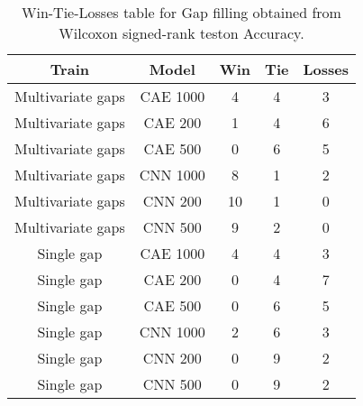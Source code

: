 \begin{table}[H]
\centering
\begin{tabular}{|c|c|c|c|c|}

    \textbf{Train} & \textbf{Model} &  \textbf{Win} &  \textbf{Tie} &  \textbf{Losses} \\
\hline

 Multivariate gaps &       CAE 1000 &             4 &             4 &                3 \\
\hline
 Multivariate gaps &        CAE 200 &             1 &             4 &                6 \\
\hline
 Multivariate gaps &        CAE 500 &             0 &             6 &                5 \\
\hline
 Multivariate gaps &       CNN 1000 &             8 &             1 &                2 \\
\hline
 Multivariate gaps &        CNN 200 &            10 &             1 &                0 \\
\hline
 Multivariate gaps &        CNN 500 &             9 &             2 &                0 \\
\hline
        Single gap &       CAE 1000 &             4 &             4 &                3 \\
\hline
        Single gap &        CAE 200 &             0 &             4 &                7 \\
\hline
        Single gap &        CAE 500 &             0 &             6 &                5 \\
\hline
        Single gap &       CNN 1000 &             2 &             6 &                3 \\
\hline
        Single gap &        CNN 200 &             0 &             9 &                2 \\
\hline
        Single gap &        CNN 500 &             0 &             9 &                2 \\
\hline

\end{tabular}
\caption{Win-Tie-Losses table for Gap filling obtained from Wilcoxon signed-rank teston Accuracy.}
\label{tab:gap_filling_model_training_data_comparison}
\end{table}